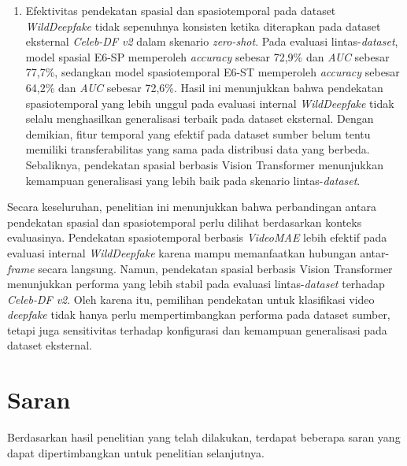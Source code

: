 \begin{enumerate}[noitemsep]
	\item Efektivitas pendekatan spasial dan spasiotemporal pada dataset \textit{WildDeepfake} tidak sepenuhnya konsisten ketika diterapkan pada dataset eksternal \textit{Celeb-DF v2} dalam skenario \textit{zero-shot}. Pada evaluasi lintas-\textit{dataset}, model spasial E6-SP memperoleh \textit{accuracy} sebesar 72,9\% dan \textit{AUC} sebesar 77,7\%, sedangkan model spasiotemporal E6-ST memperoleh \textit{accuracy} sebesar 64,2\% dan \textit{AUC} sebesar 72,6\%. Hasil ini menunjukkan bahwa pendekatan spasiotemporal yang lebih unggul pada evaluasi internal \textit{WildDeepfake} tidak selalu menghasilkan generalisasi terbaik pada dataset eksternal. Dengan demikian, fitur temporal yang efektif pada dataset sumber belum tentu memiliki transferabilitas yang sama pada distribusi data yang berbeda. Sebaliknya, pendekatan spasial berbasis Vision Transformer menunjukkan kemampuan generalisasi yang lebih baik pada skenario lintas-\textit{dataset}.
\end{enumerate}

Secara keseluruhan, penelitian ini menunjukkan bahwa perbandingan antara pendekatan spasial dan spasiotemporal perlu dilihat berdasarkan konteks evaluasinya. Pendekatan spasiotemporal berbasis \textit{VideoMAE} lebih efektif pada evaluasi internal \textit{WildDeepfake} karena mampu memanfaatkan hubungan antar-\textit{frame} secara langsung. Namun, pendekatan spasial berbasis Vision Transformer menunjukkan performa yang lebih stabil pada evaluasi lintas-\textit{dataset} terhadap \textit{Celeb-DF v2}. Oleh karena itu, pemilihan pendekatan untuk klasifikasi video \textit{deepfake} tidak hanya perlu mempertimbangkan performa pada dataset sumber, tetapi juga sensitivitas terhadap konfigurasi dan kemampuan generalisasi pada dataset eksternal. \par

\section{Saran} \label{V.Saran}
Berdasarkan hasil penelitian yang telah dilakukan, terdapat beberapa saran yang dapat dipertimbangkan untuk penelitian selanjutnya. \par

